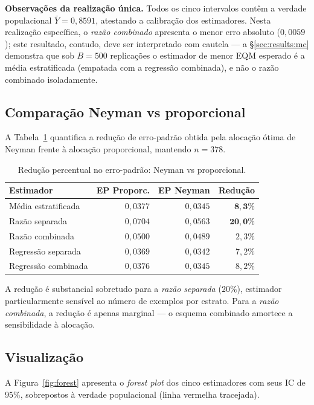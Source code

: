 \textbf{Observações da realização única.} Todos os cinco intervalos contêm a
verdade populacional $\bar{Y}=0{,}8591$, atestando a calibração dos
estimadores. Nesta realização específica, o \textit{razão combinado} apresenta
o menor erro absoluto ($0{,}0059$); este resultado, contudo, deve ser
interpretado com cautela --- a \S\ref{sec:results:mc} demonstra que sob
$B=500$ replicações o estimador de menor EQM esperado é a média
estratificada (empatada com a regressão combinada), e não o razão combinado
isoladamente.

\subsection{Comparação Neyman vs proporcional}

A Tabela~\ref{tab:se-reduction} quantifica a redução de erro-padrão obtida
pela alocação ótima de Neyman frente à alocação proporcional, mantendo
$n=378$.

\begin{table}[!t]
\centering
\caption{Redução percentual no erro-padrão: Neyman vs proporcional.}
\label{tab:se-reduction}
\begin{tabular}{lrrr}
\toprule
Estimador          & EP Proporc. & EP Neyman & Redução \\
\midrule
Média estratificada & $0{,}0377$ & $0{,}0345$ & $\mathbf{8{,}3\%}$  \\
Razão separada      & $0{,}0704$ & $0{,}0563$ & $\mathbf{20{,}0\%}$ \\
Razão combinada     & $0{,}0500$ & $0{,}0489$ & $2{,}3\%$  \\
Regressão separada  & $0{,}0369$ & $0{,}0342$ & $7{,}2\%$  \\
Regressão combinada & $0{,}0376$ & $0{,}0345$ & $8{,}2\%$  \\
\bottomrule
\end{tabular}
\end{table}

A redução é substancial sobretudo para a \textit{razão separada} ($20\%$),
estimador particularmente sensível ao número de exemplos por estrato. Para a
\textit{razão combinada}, a redução é apenas marginal --- o esquema combinado
amortece a sensibilidade à alocação.

\subsection{Visualização}

A Figura~\ref{fig:forest} apresenta o \textit{forest plot} dos cinco
estimadores com seus IC de $95\%$, sobrepostos à verdade populacional
(linha vermelha tracejada).

